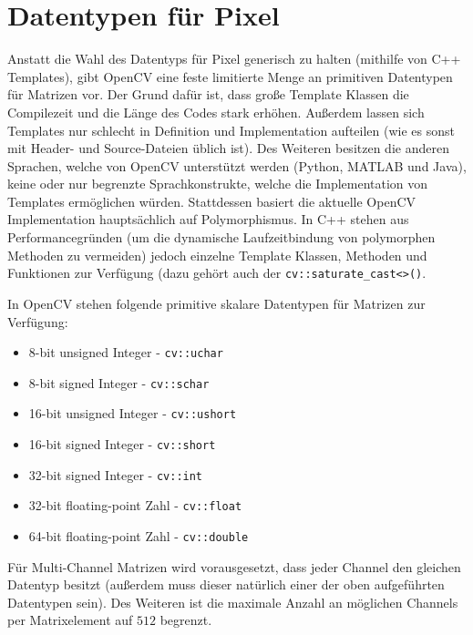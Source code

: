 \documentclass{whswinvcbook}
\begin{document}
\section{Datentypen für Pixel}\label{section-pixeltypes}
Anstatt die Wahl des Datentyps für Pixel generisch zu halten (mithilfe von C++ Templates), gibt OpenCV eine feste limitierte Menge an primitiven Datentypen für Matrizen vor.\cite{opencv3} Der Grund dafür ist, dass große Template Klassen die Compilezeit und die Länge des Codes stark erhöhen. Außerdem lassen sich Templates nur schlecht in Definition und Implementation aufteilen (wie es sonst mit Header- und Source-Dateien üblich ist). Des Weiteren besitzen die anderen Sprachen, welche von OpenCV unterstützt werden (Python, MATLAB und Java), keine oder nur begrenzte Sprachkonstrukte, welche die Implementation von Templates ermöglichen würden. Stattdessen basiert die aktuelle OpenCV Implementation hauptsächlich auf Polymorphismus. In C++ stehen aus Performancegründen (um die dynamische Laufzeitbindung von polymorphen Methoden zu vermeiden) jedoch einzelne Template Klassen, Methoden und Funktionen zur Verfügung (dazu gehört auch der \texttt{cv::saturate\_cast<>()}.

In OpenCV stehen folgende primitive skalare Datentypen für Matrizen zur Verfügung:
\begin{itemize}
    \item 8-bit unsigned Integer - \texttt{cv::uchar}
    \item 8-bit signed Integer - \texttt{cv::schar}
    \item 16-bit unsigned Integer - \texttt{cv::ushort}
    \item 16-bit signed Integer - \texttt{cv::short}
    \item 32-bit signed Integer - \texttt{cv::int}
    \item 32-bit floating-point Zahl - \texttt{cv::float}
    \item 64-bit floating-point Zahl - \texttt{cv::double}
\end{itemize}
Für Multi-Channel Matrizen wird vorausgesetzt, dass jeder Channel den gleichen Datentyp besitzt (außerdem muss dieser natürlich einer der oben aufgeführten Datentypen sein). Des Weiteren ist die maximale Anzahl an möglichen Channels per Matrixelement auf $512$ begrenzt.
\end{document}
